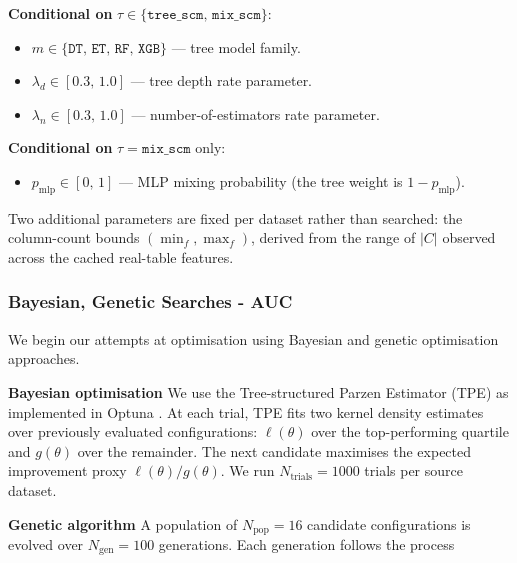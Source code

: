 \documentclass{article}
\begin{document}
\textbf{Conditional on} $\tau \in \{\texttt{tree\_scm},\, \texttt{mix\_scm}\}$:
\begin{itemize}
    \item $m \in \{\texttt{DT},\, \texttt{ET},\, \texttt{RF},\, \texttt{XGB}\}$ --- tree model family.
    \item $\lambda_d \in [0.3,\, 1.0]$ --- tree depth rate parameter.
    \item $\lambda_n \in [0.3,\, 1.0]$ --- number-of-estimators rate parameter.
\end{itemize}

\textbf{Conditional on} $\tau = \texttt{mix\_scm}$ only:
\begin{itemize}
    \item $p_{\text{mlp}} \in [0,\, 1]$ --- MLP mixing probability (the tree weight is $1 - p_{\text{mlp}}$).
\end{itemize}

Two additional parameters are fixed per dataset rather than searched: the column-count bounds $(\min_f, \max_f)$, derived from the range of $|C|$ observed across the cached real-table features.



\subsubsection{Bayesian, Genetic Searches - AUC}
We begin our attempts at optimisation using Bayesian and genetic optimisation approaches.

\textbf{Bayesian optimisation} We use the Tree-structured Parzen Estimator (TPE) as implemented in Optuna \cite{akiba_optuna_2019}. At each trial, TPE fits two kernel density estimates over previously evaluated configurations: $\ell(\theta)$ over the top-performing quartile and $g(\theta)$ over the remainder. The next candidate maximises the expected improvement proxy $\ell(\theta)/g(\theta)$. We run $N_{\text{trials}} = 1000$ trials per source dataset.

\textbf{Genetic algorithm} A population of $N_{\text{pop}} = 16$ candidate configurations is evolved over $N_{\text{gen}} = 100$ generations. Each generation follows the process
\end{document}
